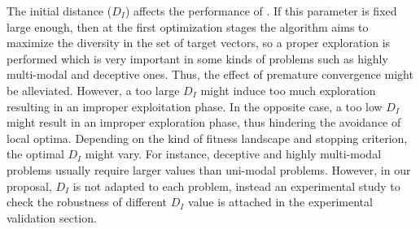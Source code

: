 The initial distance ($D_I$) affects the performance of \DEEDM{}.
%
If this parameter is fixed large enough, then at the first optimization stages the algorithm aims to maximize the diversity in the set of target vectors, 
so a proper exploration is performed which is very important in some kinds of problems such as highly multi-modal and deceptive ones.
%
Thus, the effect of premature convergence might be alleviated.
%
However, a too large $D_I$ might induce too much exploration resulting in an improper exploitation phase.
%
In the opposite case, a too low $D_I$ might result in an improper exploration phase, thus hindering the avoidance of local optima.
%
Depending on the kind of fitness landscape and stopping criterion, the optimal $D_I$ might vary.
%
For instance, deceptive and highly multi-modal problems usually require larger values than uni-modal problems.
%
However, in our proposal, $D_I$ is not adapted to each problem, instead an experimental study to check the robustness
of different $D_I$ value is attached in the experimental validation section. 
%
%
%
%
%
%
%
%

